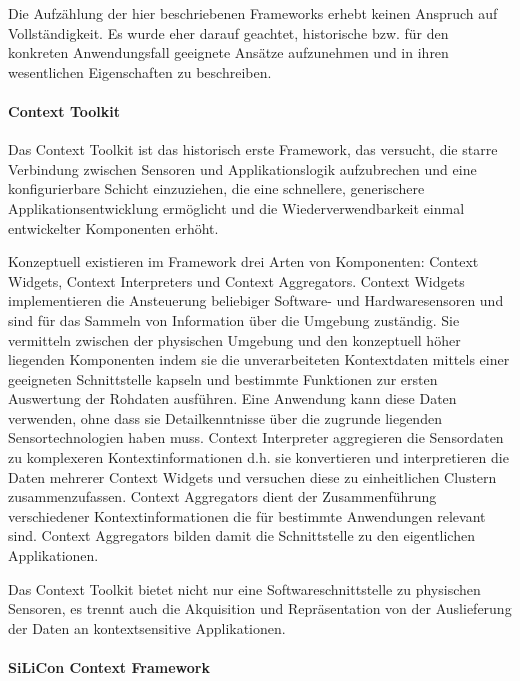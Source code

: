 Die Aufzählung der hier beschriebenen Frameworks erhebt keinen Anspruch auf Vollständigkeit. Es wurde eher darauf geachtet, historische bzw. für den konkreten Anwendungsfall geeignete Ansätze aufzunehmen und in ihren wesentlichen Eigenschaften zu beschreiben.

\paragraph{Context Toolkit} %
\label{par:context_toolkit}
 
Das Context Toolkit \citep{Dey01} ist das historisch erste Framework, das versucht, die starre Verbindung zwischen Sensoren und Applikationslogik aufzubrechen und eine konfigurierbare Schicht einzuziehen, die eine schnellere, generischere Applikationsentwicklung ermöglicht und die Wiederverwendbarkeit einmal entwickelter Komponenten erhöht.

Konzeptuell existieren im Framework drei Arten von Komponenten: Context Widgets, Context Interpreters und Context Aggregators. Context Widgets implementieren die Ansteuerung beliebiger Software- und Hardwaresensoren und sind für das Sammeln von Information über die Umgebung zuständig. Sie vermitteln zwischen der physischen Umgebung und den konzeptuell höher liegenden Komponenten indem sie die unverarbeiteten Kontextdaten mittels einer geeigneten Schnittstelle kapseln und bestimmte Funktionen zur ersten Auswertung der Rohdaten ausführen. Eine Anwendung kann diese Daten verwenden, ohne dass sie Detailkenntnisse über die zugrunde liegenden Sensortechnologien haben muss. Context Interpreter aggregieren die Sensordaten zu komplexeren Kontextinformationen d.h. sie konvertieren und interpretieren die Daten mehrerer Context Widgets und versuchen diese zu einheitlichen Clustern zusammenzufassen. Context Aggregators dient der Zusammenführung verschiedener Kontextinformationen die für bestimmte Anwendungen relevant sind. Context Aggregators bilden damit die Schnittstelle zu den eigentlichen Applikationen.

Das Context Toolkit bietet nicht nur eine Softwareschnittstelle zu physischen Sensoren, es trennt auch die Akquisition und Repräsentation von der Auslieferung der Daten an kontextsensitive Applikationen.

\paragraph{SiLiCon Context Framework} %
\label{par:silicon_context_framework}

